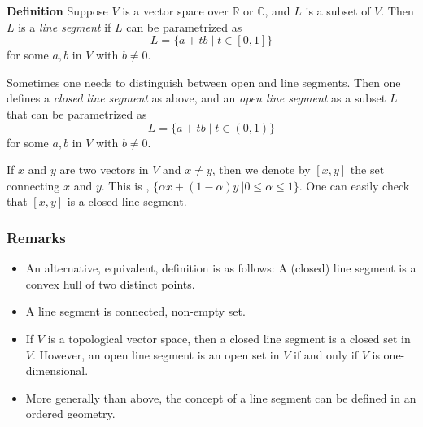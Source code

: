 \documentclass[12pt]{article}
\newcommand{\sR}[0]{\mathbb{R}}
\newcommand{\sC}[0]{\mathbb{C}}
\begin{document}
{\bf Definition} 
Suppose $V$ is a vector space over $\sR$ or $\sC$, and $L$ is a subset of $V$. 
Then $L$ is a \emph{line segment} if $L$ can be parametrized
as
$$L = \{ a+tb \mid t\in[0,1]\}$$
for some $a,b$ in $V$ with $b\neq 0$. 

Sometimes one needs to distinguish between open and 
line segments. Then one defines a \emph{closed line segment} 
as above, 
and an \emph{open line segment} as a subset $L$ that can be 
parametrized as
$$L = \{ a+tb \mid t\in(0,1)\}$$
for some $a,b$ in $V$ with $b\neq 0$. 

If $x$ and $y$ are two vectors in $V$ and $x \ne y$, then we denote by
$[x,y]$ the set  connecting $x$ and $y$. This is , $\{\alpha x + (1-\alpha )y\ | 0 \le \alpha \le 1\}$. One can easily check that $[x,y]$ is a closed line segment.

\subsubsection*{Remarks}
\begin{itemize}
\item An alternative, equivalent, definition is as follows: 
A (closed) line segment is a convex hull of two distinct points.
\item A line segment is connected, non-empty set.
\item If $V$ is a topological vector space, then a closed line segment
is a closed set in $V$. However, an open line segment is 
an open set in $V$ if and only if $V$ is one-dimensional. 
\item More generally than above, the concept of a line segment can be
  defined in an ordered geometry. 
\end{itemize}
\end{document}
